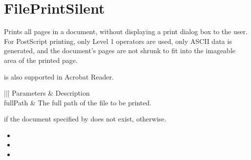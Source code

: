 \documentclass[letterpaper,12pt,english,openany,oneside]{sphinxmanual}
\begin{document}
\section{FilePrintSilent}
\label{\detokenize{IAC_API_DDE_Messages:id40}}
Prints all pages in a document, without displaying a print dialog box to the user. For PostScript printing, only Level 1 operators are used, only ASCII data is generated, and the document’s pages are not shrunk to fit into the imageable area of the printed page.

 is also supported in Acrobat Reader.


\begin{sphinxVerbatim}[commandchars=\\\{\}]
\PYG{p}{[} \PYG{p}{]}
\end{sphinxVerbatim}
\label{\detokenize{IAC_API_DDE_Messages:parameters-22}}


\begin{savenotes}\sphinxattablestart
\centering
{}\label{\detokenize{IAC_API_DDE_Messages:section-22}}\nobreak
\begin{tabular}[t]{|||}
\hline
\sphinxstyletheadfamily 
Parameters
&\sphinxstyletheadfamily 
Description
\\
\hline
fullPath
&
The full path of the file to be printed.
\\
\hline
\end{tabular}
\par
\sphinxattableend\end{savenotes}


 if the document specified by  does not exist,  otherwise.

\label{\detokenize{IAC_API_DDE_Messages:related-methods-22}}
\begin{itemize}
\item {} 

\item {} 

\item {} 

\end{itemize}
\end{document}
